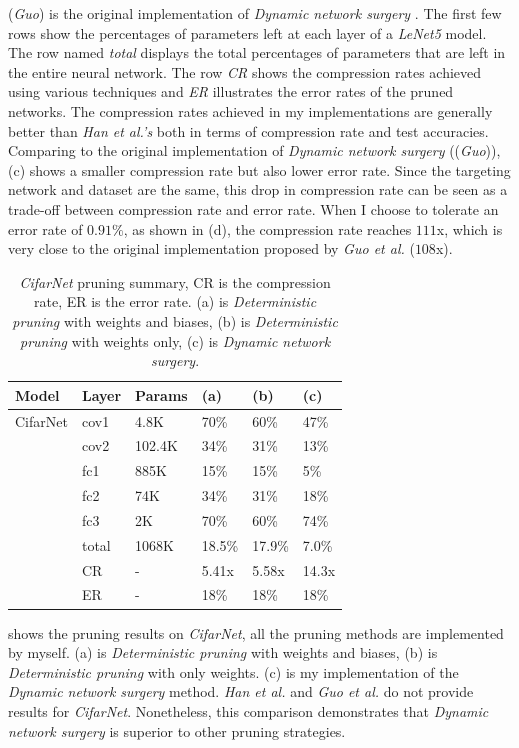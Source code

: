\documentclass[a4paper,12pt]{report}
\begin{document}
(\textit{Guo}) is the original implementation of \textit{Dynamic network surgery}
\cite{Guo}.
The first few rows show the percentages of parameters left at each layer
of a \textit{LeNet5} model.
The row named \textit{total} displays the total percentages of parameters that are left in the entire
neural network.
The row \textit{CR} shows the compression rates achieved using various techniques and
\textit{ER} illustrates the error rates of the pruned networks.
The compression rates achieved in my implementations are generally better than \textit{Han et al.'s}
both in terms of compression rate and test accuracies.
Comparing to the original implementation of \textit{Dynamic network surgery} ((\textit{Guo})),
(c) shows a smaller compression rate but also lower error rate.
Since the targeting network and dataset are the same, this drop in compression
rate can be seen as a trade-off between compression rate and error rate.
When I choose to tolerate an error rate of $0.91\%$,
as shown in (d), the compression rate reaches $111$x, which is very close to the original implementation proposed by
\textit{Guo et al.} ($108$x).

\begin{table}[!h]
  \begin{tabular}{llllll}
    \hline
    Model   &Layer     &Params    &(a)  &(b)    &(c)  \\
    \hline
    CifarNet  &cov1     &4.8K     &70\%   &60\%   &47\% \\
            &cov2     &102.4K     &34\%   &31\%   &13\% \\
            &fc1      &885K       &15\%   &15\%   &5\% \\
            &fc2      &74K        &34\%   &31\%   &18\% \\
            &fc3      &2K         &70\%   &60\%   &74\% \\
            &total    &1068K      &18.5\%  &17.9\%  &7.0\% \\
    \hline

            &CR       &-          &5.41x   &5.58x  &14.3x \\
            &ER       &-          &18\%   &18\%  &18\% \\
    \hline
  \end{tabular}
  \centering
  \caption{\textit{CifarNet} pruning summary, CR is the compression
  rate, ER is the error rate. (a) is \textit{Deterministic pruning} with weights and biases, (b) is
  \textit{Deterministic pruning} with weights only, (c) is \textit{Dynamic network surgery}.}
  \label{fig:cifar_prune_org_summary}
\end{table}
 shows the pruning results on \textit{CifarNet},
all the pruning methods are implemented by myself.
(a) is \textit{Deterministic pruning} with weights and biases, (b) is \textit{Deterministic
pruning} with only weights.
(c) is my implementation of the \textit{Dynamic network surgery} method.
\textit{Han et al.} and \textit{Guo et al.} do not provide results for \textit{CifarNet}.
Nonetheless, this comparison demonstrates that \textit{Dynamic network surgery}
is superior to other pruning strategies.
\end{document}
